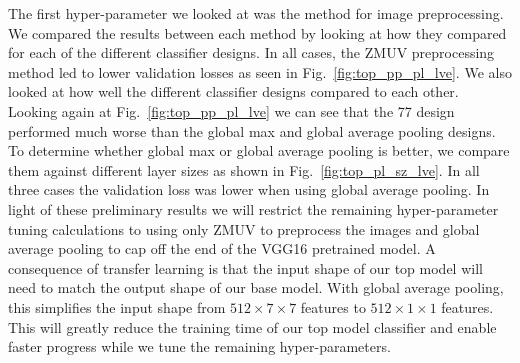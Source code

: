 \documentclass[12pt,journal,compsoc]{IEEEtran}
\begin{document}
The first hyper-parameter we looked at was the method for image preprocessing. We compared the results between each method by looking at how they compared for each of the different classifier designs. In all cases, the ZMUV preprocessing method led to lower validation losses as seen in Fig.~\ref{fig:top_pp_pl_lve}. We also looked at how well the different classifier designs compared to each other. Looking again at Fig.~\ref{fig:top_pp_pl_lve} we can see that the 77 design performed much worse than the global max and global average pooling designs. To determine whether global max or global average pooling is better, we compare them against different layer sizes as shown in Fig.~\ref{fig:top_pl_sz_lve}. In all three cases the validation loss was lower when using global average pooling. In light of these preliminary results we will restrict the remaining hyper-parameter tuning calculations to using only ZMUV to preprocess the images and global average pooling to cap off the end of the VGG16 pretrained model. A consequence of transfer learning is that the input shape of our top model will need to match the output shape of our base model. With global average pooling, this simplifies the input shape from $512\times7\times7$ features to $512\times1\times1$ features. This will greatly reduce the training time of our top model classifier and enable faster progress while we tune the remaining hyper-parameters.
\end{document}
